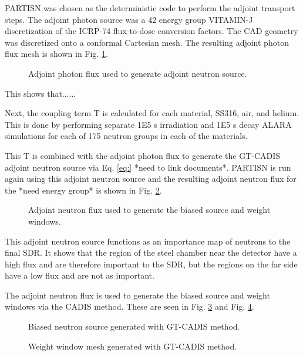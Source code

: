 PARTISN was chosen as the deterministic code to perform the adjoint transport
steps.  The adjoint photon source was a 42 energy group VITAMIN-J discretization of the
ICRP-74 flux-to-dose conversion factors.  The CAD geometry was discretized onto
a conformal Cartesian mesh.  The resulting adjoint photon flux mesh is shown in
Fig. \ref{fig:adj_p_flux}.

\begin{figure}\label{fig:adj_p_flux}
	\caption [GT-CADIS adjoint photon flux] 
	{Adjoint photon flux used to generate adjoint neutron source.}
\end{figure}

This shows that......

Next, the coupling term T is calculated for each material, SS316, air, and
helium.  This is done by performing separate 1E5 s irradiation and 1E5 s decay ALARA
simulations for each of 175 neutron groups in each of the materials.

This T is combined with the adjoint photon flux to generate the GT-CADIS
adjoint neutron source via Eq. \ref{eq:} *need to link documents*. 
PARTISN is run again using this adjoint neutron source and the resulting
adjoint neutron flux for the *need energy group* is shown in Fig.
\ref{fig:adj_n_flux}.

\begin{figure}\label{fig:adj_n_flux}
	\caption [GT-CADIS adjoint neutron flux] 
	{Adjoint neutron flux used to generate the biased source and weight
	windows. }
\end{figure}

This adjoint neutron source functions as an importance map of neutrons to the
final SDR.  It shows that the region of the steel chamber near the detector
have a high flux and are therefore important to the SDR, but the regions on the
far side have a low flux and are not as important.

The adjoint neutron flux is used to generate the biased source and weight
windows via the CADIS method.  These are seen in Fig. \ref{fig:biased_src} and
Fig. \ref{fig:wwinp}.

\begin{figure} \label{fig:biased_src}
	\caption [GT-CADIS biased neutron source] 
	{Biased neutron source generated with GT-CADIS method.}
\end{figure}

\begin{figure} \label{fig:wwinp}
	\caption [GT-CADIS weight window mesh]
	{Weight window mesh generated with GT-CADIS method.}
\end{figure}

